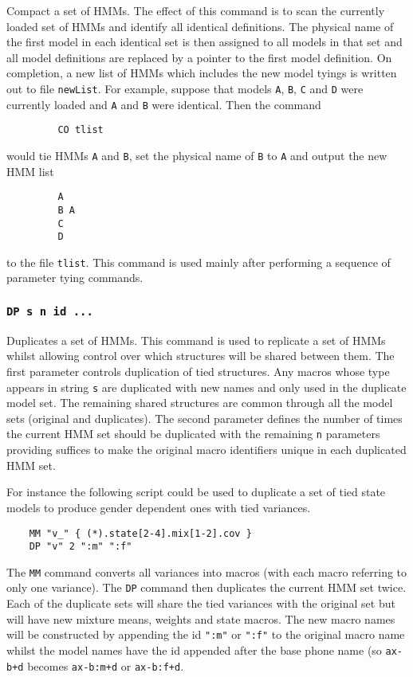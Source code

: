 Compact a set of HMMs.  The effect of this command is to
scan the currently loaded set of HMMs and identify all identical
definitions.  The physical name of the first model in each identical
set is then assigned to all models in that set and all
model definitions are replaced by a pointer to the first
model definition.  On completion,
a new list of HMMs which includes the new model tyings is
written out to file \texttt{newList}.  For example, suppose that
models \texttt{A}, \texttt{B}, \texttt{C} and \texttt{D} were currently
loaded and \texttt{A} and \texttt{B} were identical.  Then the command
\begin{verbatim}
         CO tlist
\end{verbatim}
would tie HMMs \texttt{A} and \texttt{B}, 
set the physical name of \texttt{B} to \texttt{A} and output the
new HMM list
\begin{verbatim}
         A
         B A
         C
         D
\end{verbatim}
to the file \texttt{tlist}.  This command is used mainly after 
performing a sequence of parameter tying commands.

\subsubsection*{\tt DP s n id ...}

Duplicates a set of HMMs.  This command is used to replicate a
set of HMMs whilst allowing control over which structures will
be shared between them.
The first parameter controls duplication of tied structures.  Any
macros whose type appears in string \texttt{s} are duplicated
with new names and only used in the duplicate model set.  The remaining
shared structures are common through all the model sets (original and
duplicates).
The second parameter defines the number of times the current
HMM set should be duplicated with the remaining \texttt{n} parameters
providing suffices to make the original macro identifiers unique
in each duplicated HMM set.

For instance the following script could be used to duplicate
a set of tied state models to produce gender dependent ones
with tied variances.
\begin{verbatim}
    MM "v_" { (*).state[2-4].mix[1-2].cov }
    DP "v" 2 ":m" ":f" 
\end{verbatim}
The \texttt{MM} command converts all variances into macros
(with each macro referring to only one variance).
The \texttt{DP} command then duplicates the current HMM set twice.
Each of the duplicate sets will share the tied variances with
the original set but will have new mixture means, weights and
state macros.  The new macro names will be constructed by
appending the id \texttt{":m"} or \texttt{":f"} to the original 
macro name whilst the model names have the id appended after
the base phone name (so \texttt{ax-b+d} becomes \texttt{ax-b:m+d} or
\texttt{ax-b:f+d}.

